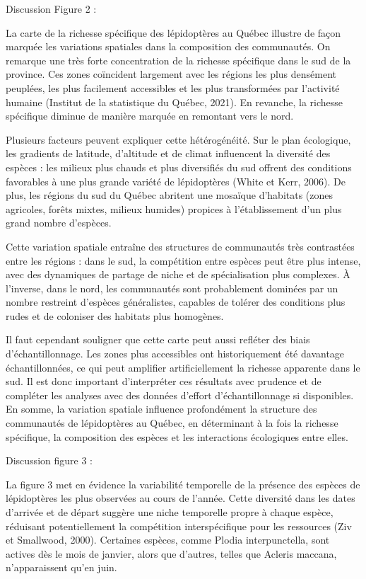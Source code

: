 \documentclass[9pt,twocolumn,twoside,]{pnas-new}
\begin{document}
Discussion Figure 2 :

La carte de la richesse spécifique des lépidoptères au Québec illustre
de façon marquée les variations spatiales dans la composition des
communautés. On remarque une très forte concentration de la richesse
spécifique dans le sud de la province. Ces zones coïncident largement
avec les régions les plus densément peuplées, les plus facilement
accessibles et les plus transformées par l'activité humaine (Institut de
la statistique du Québec, 2021). En revanche, la richesse spécifique
diminue de manière marquée en remontant vers le nord.

Plusieurs facteurs peuvent expliquer cette hétérogénéité. Sur le plan
écologique, les gradients de latitude, d'altitude et de climat
influencent la diversité des espèces : les milieux plus chauds et plus
diversifiés du sud offrent des conditions favorables à une plus grande
variété de lépidoptères (White et Kerr, 2006). De plus, les régions du
sud du Québec abritent une mosaïque d'habitats (zones agricoles, forêts
mixtes, milieux humides) propices à l'établissement d'un plus grand
nombre d'espèces.

Cette variation spatiale entraîne des structures de communautés très
contrastées entre les régions : dans le sud, la compétition entre
espèces peut être plus intense, avec des dynamiques de partage de niche
et de spécialisation plus complexes. À l'inverse, dans le nord, les
communautés sont probablement dominées par un nombre restreint d'espèces
généralistes, capables de tolérer des conditions plus rudes et de
coloniser des habitats plus homogènes.

Il faut cependant souligner que cette carte peut aussi refléter des
biais d'échantillonnage. Les zones plus accessibles ont historiquement
été davantage échantillonnées, ce qui peut amplifier artificiellement la
richesse apparente dans le sud. Il est donc important d'interpréter ces
résultats avec prudence et de compléter les analyses avec des données
d'effort d'échantillonnage si disponibles. En somme, la variation
spatiale influence profondément la structure des communautés de
lépidoptères au Québec, en déterminant à la fois la richesse spécifique,
la composition des espèces et les interactions écologiques entre elles.

Discussion figure 3 :

La figure 3 met en évidence la variabilité temporelle de la présence des
espèces de lépidoptères les plus observées au cours de l'année. Cette
diversité dans les dates d'arrivée et de départ suggère une niche
temporelle propre à chaque espèce, réduisant potentiellement la
compétition interspécifique pour les ressources (Ziv et Smallwood,
2000). Certaines espèces, comme Plodia interpunctella, sont actives dès
le mois de janvier, alors que d'autres, telles que Acleris maccana,
n'apparaissent qu'en juin.
\end{document}
